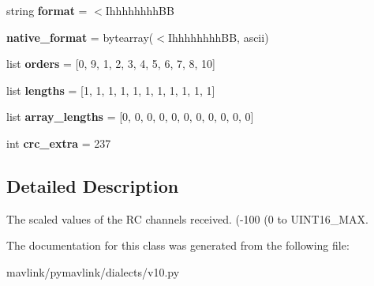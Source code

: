 \begin{DoxyCompactItemize}
\item 
\mbox{\label{classpymavlink_1_1dialects_1_1v10_1_1MAVLink__rc__channels__scaled__message_a5ba87601fa3f0bab9d7422815c864eaf}} 
string {\bfseries format} = \textquotesingle{}$<$Ihhhhhhhh\+BB\textquotesingle{}
\item 
\mbox{\label{classpymavlink_1_1dialects_1_1v10_1_1MAVLink__rc__channels__scaled__message_a04c151a9bd8efee5145be8012ef60539}} 
{\bfseries native\+\_\+format} = bytearray(\textquotesingle{}$<$Ihhhhhhhh\+BB\textquotesingle{}, \textquotesingle{}ascii\textquotesingle{})
\item 
\mbox{\label{classpymavlink_1_1dialects_1_1v10_1_1MAVLink__rc__channels__scaled__message_a8fe4a14fe1313069a57d5b914a127564}} 
list {\bfseries orders} = \mbox{[}0, 9, 1, 2, 3, 4, 5, 6, 7, 8, 10\mbox{]}
\item 
\mbox{\label{classpymavlink_1_1dialects_1_1v10_1_1MAVLink__rc__channels__scaled__message_a2388aca605e6ce3ca85f7bf0e954ba06}} 
list {\bfseries lengths} = \mbox{[}1, 1, 1, 1, 1, 1, 1, 1, 1, 1, 1\mbox{]}
\item 
\mbox{\label{classpymavlink_1_1dialects_1_1v10_1_1MAVLink__rc__channels__scaled__message_ae75c65fd42b15ccad182fcb94864a75c}} 
list {\bfseries array\+\_\+lengths} = \mbox{[}0, 0, 0, 0, 0, 0, 0, 0, 0, 0, 0\mbox{]}
\item 
\mbox{\label{classpymavlink_1_1dialects_1_1v10_1_1MAVLink__rc__channels__scaled__message_a66b0b621b9671fa88b0d7dbc41603dd3}} 
int {\bfseries crc\+\_\+extra} = 237
\end{DoxyCompactItemize}


\subsection{Detailed Description}
\begin{DoxyVerb}The scaled values of the RC channels received. (-100%
(0%
to UINT16_MAX.
\end{DoxyVerb}
 

The documentation for this class was generated from the following file\+:\begin{DoxyCompactItemize}
\item 
mavlink/pymavlink/dialects/v10.\+py\end{DoxyCompactItemize}
